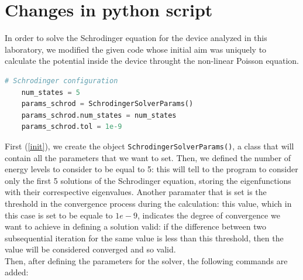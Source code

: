 \chapter{Changes in python script}
In order to solve the Schrodinger equation for the device analyzed in this laboratory, we modified the given code whose initial aim was uniquely to calculate the potential inside the device throught the non-linear Poisson equation.\\
\begin{lstlisting}[language=Python, caption={Initialization of Schrodinger parameters}, label={init}, frame=single, framesep=8pt]
    # Schrodinger configuration
    num_states = 5
    params_schrod = SchrodingerSolverParams()
    params_schrod.num_states = num_states
    params_schrod.tol = 1e-9
\end{lstlisting}
First (\ref{init}), we create the object \texttt{SchrodingerSolverParams()}, a class that will contain all the parameters that we want to set.
Then, we defined the number of energy levels to consider to be equal to 5: this will tell to the program to consider only the first 5 solutions of the Schrodinger equation, storing the eigenfunctions with their correspective eigenvalues. Another paramater that is set is the threshold in the convergence process during the calculation: this value, which in this case
is set to be equale to $1e-9$, indicates the degree of convergence we want to achieve in defining a solution valid: if the difference between two subsequential iteration for the same value is less than this threshold, then the value will be considered converged and so valid.\\
Then, after defining the parameters for the solver, the following commands are added:\\

